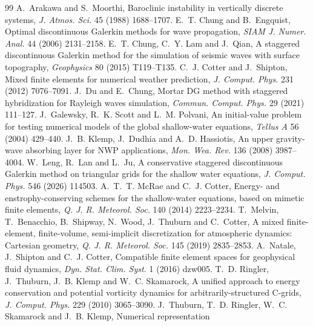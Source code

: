 \documentclass[preprint,12pt]{elsarticle}
\theoremstyle{definition}
\begin{document}
\begin{thebibliography}{99}
 A.~Arakawa and S.~Moorthi, Baroclinic instability in vertically discrete systems,
  \emph{J. Atmos. Sci.} 45 (1988) 1688--1707.
 E.~T. Chung and B.~Engquist, Optimal discontinuous Galerkin methods for wave
  propagation, \emph{SIAM J. Numer. Anal.} 44 (2006) 2131--2158.
 E.~T. Chung, C.~Y. Lam and J.~Qian, A staggered discontinuous Galerkin method for
  the simulation of seismic waves with surface topography, \emph{Geophysics} 80 (2015) T119--T135.
 C.~J. Cotter and J.~Shipton, Mixed finite elements for numerical weather
  prediction, \emph{J. Comput. Phys.} 231 (2012) 7076--7091.
 J.~Du and E.~Chung, Mortar DG method with staggered hybridization for Rayleigh waves
  simulation, \emph{Commun. Comput. Phys.} 29 (2021) 111--127.
 J.~Galewsky, R.~K. Scott and L.~M. Polvani, An initial-value problem for testing
  numerical models of the global shallow-water equations, \emph{Tellus A} 56 (2004) 429--440.
 J.~B. Klemp, J.~Dudhia and A.~D. Hassiotis, An upper gravity-wave absorbing layer for NWP
  applications, \emph{Mon. Wea. Rev.} 136 (2008) 3987--4004.
 W.~Leng, R.~Lan and L.~Ju, A conservative staggered discontinuous Galerkin method on
  triangular grids for the shallow water equations, \emph{J. Comput. Phys.} 546 (2026) 114503.
 A.~T.~T. McRae and C.~J. Cotter, Energy- and enstrophy-conserving schemes for
  the shallow-water equations, based on mimetic finite elements, \emph{Q. J. R. Meteorol. Soc.} 140 (2014)
  2223--2234.
 T.~Melvin, T.~Benacchio, B.~Shipway, N.~Wood, J.~Thuburn and C.~Cotter, A mixed
  finite-element, finite-volume, semi-implicit discretization for atmospheric dynamics: Cartesian geometry,
  \emph{Q. J. R. Meteorol. Soc.} 145 (2019) 2835--2853.
 A.~Natale, J.~Shipton and C.~J. Cotter, Compatible finite element spaces
  for geophysical fluid dynamics, \emph{Dyn. Stat. Clim. Syst.} 1 (2016) dzw005.
 T.~D. Ringler, J.~Thuburn, J.~B. Klemp and W.~C. Skamarock, A unified approach to
  energy conservation and potential vorticity dynamics for arbitrarily-structured C-grids,
  \emph{J. Comput. Phys.} 229 (2010) 3065--3090.
 J.~Thuburn, T.~D. Ringler, W.~C. Skamarock and J.~B. Klemp, Numerical representation

\end{thebibliography}
\end{document}
